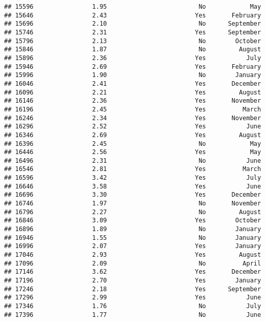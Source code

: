 \documentclass[
]{article}
\begin{document}
\begin{verbatim}
## 15596                1.95                         No            May
## 15646                2.43                        Yes       February
## 15696                2.10                         No      September
## 15746                2.31                        Yes      September
## 15796                2.13                         No        October
## 15846                1.87                         No         August
## 15896                2.36                        Yes           July
## 15946                2.69                        Yes       February
## 15996                1.90                         No        January
## 16046                2.41                        Yes       December
## 16096                2.21                        Yes         August
## 16146                2.36                        Yes       November
## 16196                2.45                        Yes          March
## 16246                2.34                        Yes       November
## 16296                2.52                        Yes           June
## 16346                2.69                        Yes         August
## 16396                2.45                         No            May
## 16446                2.56                        Yes            May
## 16496                2.31                         No           June
## 16546                2.81                        Yes          March
## 16596                3.42                        Yes           July
## 16646                3.58                        Yes           June
## 16696                3.30                        Yes       December
## 16746                1.97                         No       November
## 16796                2.27                         No         August
## 16846                3.09                        Yes        October
## 16896                1.89                         No        January
## 16946                1.55                         No        January
## 16996                2.07                        Yes        January
## 17046                2.93                        Yes         August
## 17096                2.09                         No          April
## 17146                3.62                        Yes       December
## 17196                2.70                        Yes        January
## 17246                2.18                        Yes      September
## 17296                2.99                        Yes           June
## 17346                1.76                         No           July
## 17396                1.77                         No           June

\end{verbatim}
\end{document}
